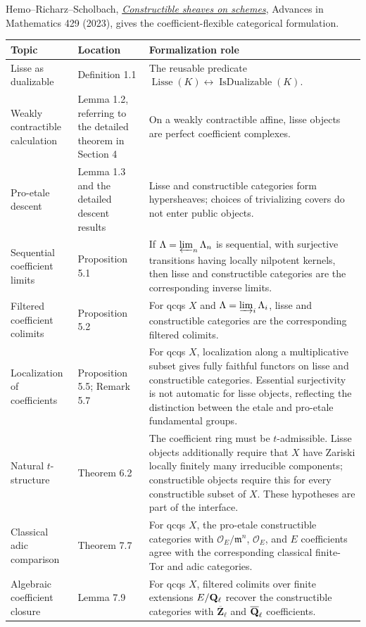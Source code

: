 Hemo--Richarz--Scholbach,
\href{https://arxiv.org/abs/2305.18131}
{\emph{Constructible sheaves on schemes}}, Advances in Mathematics 429
(2023), gives the coefficient-flexible categorical formulation.

\begin{longtable}{
 >{\raggedright\arraybackslash}p{}
 >{\raggedright\arraybackslash}p{}
 >{\raggedright\arraybackslash}p{}}
\toprule
Topic & Location & Formalization role\\
\midrule
\endhead
Lisse as dualizable &
Definition 1.1 &
The reusable predicate
\(\operatorname{Lisse}(K)\leftrightarrow
 \operatorname{IsDualizable}(K)\).\\

Weakly contractible calculation &
Lemma 1.2, referring to the detailed theorem in Section 4 &
On a weakly contractible affine, lisse objects are perfect coefficient
complexes.\\

Pro-etale descent &
Lemma 1.3 and the detailed descent results &
Lisse and constructible categories form hypersheaves; choices of
trivializing covers do not enter public objects.\\

Sequential coefficient limits &
Proposition 5.1 &
If \(\Lambda=\varprojlim_n\Lambda_n\) is sequential, with surjective
transitions having locally nilpotent kernels, then lisse and constructible
categories are the corresponding inverse limits.\\

Filtered coefficient colimits &
Proposition 5.2 &
For qcqs \(X\) and \(\Lambda=\varinjlim_i\Lambda_i\), lisse and constructible
categories are the corresponding filtered colimits.\\

Localization of coefficients &
Proposition 5.5; Remark 5.7 &
For qcqs \(X\), localization along a multiplicative subset gives fully
faithful functors on lisse and constructible categories.  Essential
surjectivity is not automatic for lisse objects, reflecting the distinction
between the etale and pro-etale fundamental groups.\\

Natural \(t\)-structure &
Theorem 6.2 &
The coefficient ring must be \(t\)-admissible.  Lisse objects additionally
require that \(X\) have Zariski locally finitely many irreducible components;
constructible objects require this for every constructible subset of \(X\).
These hypotheses are part of the interface.\\

Classical adic comparison &
Theorem 7.7 &
For qcqs \(X\), the pro-etale constructible categories with
\(\mathcal O_E/\mathfrak m^n\), \(\mathcal O_E\), and \(E\) coefficients
agree with the corresponding classical finite-Tor and adic categories.\\

Algebraic coefficient closure &
Lemma 7.9 &
For qcqs \(X\), filtered colimits over finite extensions
\(E/\mathbf Q_\ell\) recover the constructible categories with \(\overline{\mathbf
Z}_\ell\) and \(\overline{\mathbf Q}_\ell\) coefficients.\\
\bottomrule
\end{longtable}

